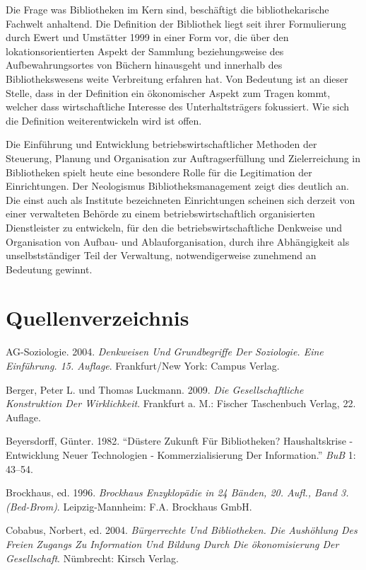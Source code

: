\documentclass[a4paper,
fontsize=11pt,
oneside,
numbers=noperiodatend,
parskip=half-,
bibliography=totoc,
final
]{scrartcl}
\begin{document}
Die Frage was Bibliotheken im Kern sind, beschäftigt die
bibliothekarische Fachwelt anhaltend. Die Definition der Bibliothek
liegt seit ihrer Formulierung durch Ewert und Umstätter 1999 in einer
Form vor, die über den lokationsorientierten Aspekt der Sammlung
beziehungsweise des Aufbewahrungsortes von Büchern hinausgeht und
innerhalb des Bibliothekswesens weite Verbreitung erfahren hat. Von
Bedeutung ist an dieser Stelle, dass in der Definition ein ökonomischer
Aspekt zum Tragen kommt, welcher dass wirtschaftliche Interesse des
Unterhaltsträgers fokussiert. Wie sich die Definition weiterentwickeln
wird ist offen.

Die Einführung und Entwicklung betriebswirtschaftlicher Methoden der
Steuerung, Planung und Organisation zur Auftragserfüllung und
Zielerreichung in Bibliotheken spielt heute eine besondere Rolle für die
Legitimation der Einrichtungen. Der Neologismus Bibliotheksmanagement
zeigt dies deutlich an. Die einst auch als Institute bezeichneten
Einrichtungen scheinen sich derzeit von einer verwalteten Behörde zu
einem betriebswirtschaftlich organisierten Dienstleister zu entwickeln,
für den die betriebswirtschaftliche Denkweise und Organisation von
Aufbau- und Ablauforganisation, durch ihre Abhängigkeit als
unselbstständiger Teil der Verwaltung, notwendigerweise zunehmend an
Bedeutung gewinnt.

\section*{Quellenverzeichnis}\label{quellenverzeichnis}

AG-Soziologie. 2004. \emph{Denkweisen Und Grundbegriffe Der Soziologie.
Eine Einführung. 15. Auflage}. Frankfurt/New York: Campus Verlag.

Berger, Peter L. und Thomas Luckmann. 2009. \emph{Die Gesellschaftliche
Konstruktion Der Wirklichkeit}. Frankfurt a. M.: Fischer Taschenbuch
Verlag, 22. Auflage.

Beyersdorff, Günter. 1982. \enquote{Düstere Zukunft Für Bibliotheken?
Haushaltskrise - Entwicklung Neuer Technologien - Kommerzialisierung Der
Information.} \emph{BuB} 1: 43--54.

Brockhaus, ed. 1996. \emph{Brockhaus Enzyklopädie in 24 Bänden, 20.
Aufl., Band 3. (Bed-Brom)}. Leipzig-Mannheim: F.A. Brockhaus GmbH.

Cobabus, Norbert, ed. 2004. \emph{Bürgerrechte Und Bibliotheken. Die
Aushöhlung Des Freien Zugangs Zu Information Und Bildung Durch Die
ökonomisierung Der Gesellschaft}. Nümbrecht: Kirsch Verlag.
\end{document}
